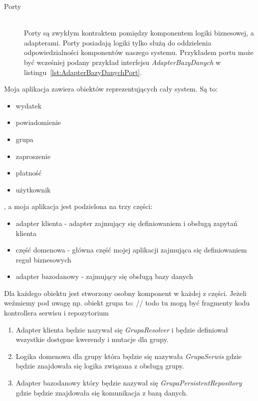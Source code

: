 \begin{description}
\item[Porty] \hfill \\ Porty są zwykłym kontraktem pomiędzy komponentem logiki biznesowej, a adapterami. Porty posiadają logiki tylko służą do oddzielenia odpowiedzialności komponentów naszego systemu. Przykładem portu może być wcześniej podany przykład interfejsu \emph{AdapterBazyDanych} w listingu~\ref{lst:AdapterBazyDanychPort}. 

\end{description}
Moja aplikacja zawiera obiektów reprezentujących cały system. Są to:
\begin{itemize}
  \item wydatek
  \item powiadomienie
  \item grupa
  \item zaproszenie
  \item płatność
  \item użytkownik
\end{itemize}
, a moja aplikacja jest podzielona na trzy części:
\begin{itemize}
  \item adapter klienta - adapter zajmujący się definiowaniem i obsługą zapytań klienta
  \item część domenowa - główna część mojej aplikacji zajmująca się definiowaniem reguł biznesowych
  \item adapter bazodanowy - zajmujący się obsługą bazy danych
\end{itemize}
Dla każdego obiektu jest stworzony osobny komponent w każdej z części. Jeżeli weźmiemy pod uwagę np. obiekt grupa to:
// todo tu mogą być fragmenty kodu kontrollera serwisu i repozytorium
\begin{enumerate}
  \item Adapter klienta będzie nazywał się \emph{GrupaResolver} i będzie definiował wszystkie dostępne kwerendy i mutacje dla grupy.

  \item Logika domenowa dla grupy która będzie się nazywała \emph{GrupaSerwis} gdzie będzie znajdowała się logika związana z obsługą grupy.
  \item Adapter bazodanowy który będzie nazywał się \emph{GrupaPersistentRepository} gdzie będzie znajdowała się komunikacja z bazą danych.
    
\end{enumerate}

